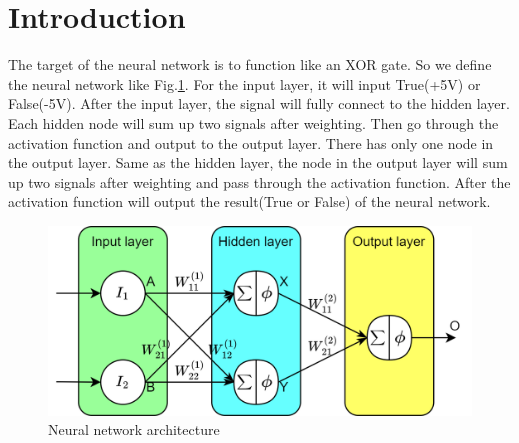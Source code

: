 \documentclass[a4paper, 12pt, AutoFakeBold]{report}
\newcommand{\figref}[1]{Fig.\ref{#1}}
\begin{document}
    \section{Introduction}
    The target of the neural network is to function like an XOR gate. So we define the neural network like \figref{fig:NN_architecture}. For the input layer, it will input True(+5V) or False(-5V). After the input layer, the signal will fully connect to the hidden layer. Each hidden node will sum up two signals after weighting. Then go through the activation function and output to the output layer. There has only one node in the output layer. Same as the hidden layer, the node in the output layer will sum up two signals after weighting and pass through the activation function. After the activation function will output the result(True or False) of the neural network.
    \begin{figure}[H]
        \centering
        \includegraphics[scale=.3]{figs/NN.png}
        \caption{Neural network architecture}
        \label{fig:NN_architecture}
    \end{figure}
\end{document}
